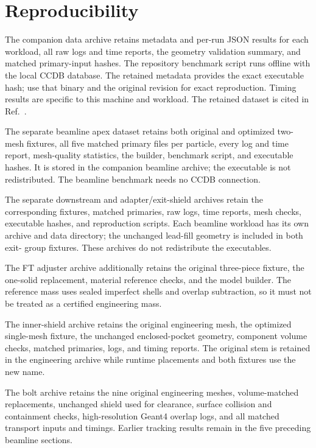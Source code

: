 \FloatBarrier

\section{Reproducibility}

The companion data archive retains metadata and per-run JSON results for each workload, all raw logs and time
reports, the geometry validation summary, and matched primary-input hashes. The repository benchmark script
runs offline with the local CCDB database. The retained metadata provides the exact executable hash; use that
binary and the original revision for exact reproduction. Timing results are specific to this machine and
workload. The retained dataset is cited in Ref.~\cite{dataset}.

The separate beamline apex dataset retains both original and optimized two-mesh fixtures, all five matched
primary files per particle, every log and time report, mesh-quality statistics, the builder, benchmark
script, and executable hashes. It is stored in the companion beamline archive; the executable is not
redistributed. The beamline benchmark needs no CCDB connection.

The separate downstream and adapter/exit-shield archives retain the corresponding fixtures, matched
primaries, raw logs, time reports, mesh checks, executable hashes, and reproduction scripts. Each beamline
workload has its own archive and data directory; the unchanged lead-fill geometry is included in both exit-
group fixtures. These archives do not redistribute the executables.

The FT adjuster archive additionally retains the original three-piece fixture, the one-solid replacement,
material reference checks, and the model builder. The reference mass uses sealed imperfect shells and
overlap subtraction, so it must not be treated as a certified engineering mass.

The inner-shield archive retains the original engineering mesh, the optimized single-mesh fixture, the
unchanged enclosed-pocket geometry, component volume checks, matched primaries, logs, and timing reports.
The original stem is retained in the engineering archive while runtime placements and both fixtures use the
new name.

The bolt archive retains the nine original engineering meshes, volume-matched replacements, unchanged shield
used for clearance, surface collision and containment checks, high-resolution Geant4 overlap logs, and all
matched transport inputs and timings. Earlier tracking results remain in the five preceding beamline
sections.

